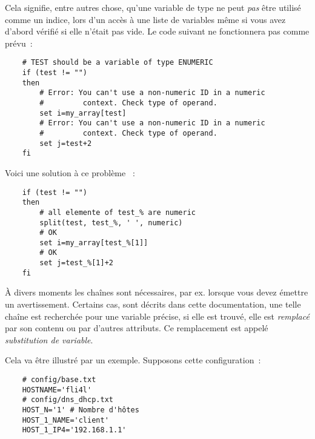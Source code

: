     Cela signifie, entre autres chose, qu'une variable de type  ne
	peut \emph{pas} être utilisé comme un indice, lors d'un accès à une liste de variables
	même si vous avez d'abord vérifié si elle n'était pas vide. Le code suivant ne
	fonctionnera pas comme prévu~:
\begin{example}
\begin{verbatim}
    # TEST should be a variable of type ENUMERIC
    if (test != "")
    then
        # Error: You can't use a non-numeric ID in a numeric
        #         context. Check type of operand.
        set i=my_array[test]
        # Error: You can't use a non-numeric ID in a numeric
        #         context. Check type of operand.
        set j=test+2
    fi
\end{verbatim}
\end{example}

    Voici une solution à ce problème ~:
\begin{example}
\begin{verbatim}
    if (test != "")
    then
        # all elemente of test_% are numeric
        split(test, test_%, ' ', numeric)
        # OK
        set i=my_array[test_%[1]]
        # OK
        set j=test_%[1]+2
    fi
\end{verbatim}
\end{example}


    À divers moments les chaînes sont nécessaires, par ex. lorsque vous devez émettre
	 un avertissement. Certains cas, sont décrits dans
	cette documentation, une telle chaîne est recherchée pour une variable précise, si elle
	est trouvé, elle est \emph{remplacé} par son contenu ou par d'autres attributs.
	Ce remplacement est appelé \emph{substitution de variable}.

    Cela va être illustré par un exemple. Supposons cette configuration~:

\begin{example}
\begin{verbatim}
    # config/base.txt
    HOSTNAME='fli4l'
    # config/dns_dhcp.txt
    HOST_N='1' # Nombre d'hôtes
    HOST_1_NAME='client'
    HOST_1_IP4='192.168.1.1'
\end{verbatim}
\end{example}

